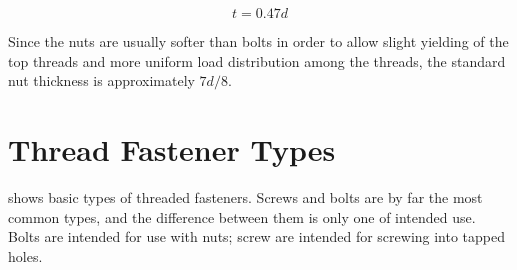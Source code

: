 \documentclass[
10pt,
a4paper,
openany,
svgnames,
]{book}
\begin{document}
\begin{equation} \label{eqn: required nut thickness}
  t = 0.47d
\end{equation}

Since the nuts are usually softer than bolts in order to allow slight yielding of the top threads and more uniform load distribution among the threads, the standard nut thickness is approximately $7d/8$.

\section{Thread Fastener Types}

 shows basic types of threaded fasteners. Screws and bolts are by far the most common types, and the difference between them is only one of intended use. Bolts are intended for use with nuts; screw are intended for screwing into tapped holes.
\end{document}
